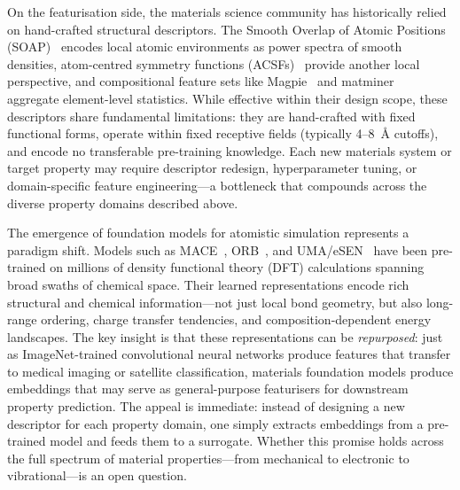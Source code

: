 On the featurisation side, the materials science community has historically relied on hand-crafted structural descriptors.
The Smooth Overlap of Atomic Positions (SOAP)~\cite{bartok2013representing} encodes local atomic environments as power spectra of smooth densities, atom-centred symmetry functions (ACSFs)~\cite{behler2011atom} provide another local perspective, and compositional feature sets like Magpie~\cite{ward2016general} and matminer~\cite{ward2018matminer} aggregate element-level statistics.
While effective within their design scope, these descriptors share fundamental limitations: they are hand-crafted with fixed functional forms, operate within fixed receptive fields (typically 4--8~\AA{} cutoffs), and encode no transferable pre-training knowledge.
Each new materials system or target property may require descriptor redesign, hyperparameter tuning, or domain-specific feature engineering---a bottleneck that compounds across the diverse property domains described above.

The emergence of foundation models for atomistic simulation represents a paradigm shift.
Models such as MACE~\cite{batatia2022mace,batatia2024foundation}, ORB~\cite{orb2024}, and UMA/eSEN~\cite{uma2025} have been pre-trained on millions of density functional theory (DFT) calculations spanning broad swaths of chemical space.
Their learned representations encode rich structural and chemical information---not just local bond geometry, but also long-range ordering, charge transfer tendencies, and composition-dependent energy landscapes.
The key insight is that these representations can be \emph{repurposed}: just as ImageNet-trained convolutional neural networks produce features that transfer to medical imaging or satellite classification, materials foundation models produce embeddings that may serve as general-purpose featurisers for downstream property prediction.
The appeal is immediate: instead of designing a new descriptor for each property domain, one simply extracts embeddings from a pre-trained model and feeds them to a surrogate.
Whether this promise holds across the full spectrum of material properties---from mechanical to electronic to vibrational---is an open question.

